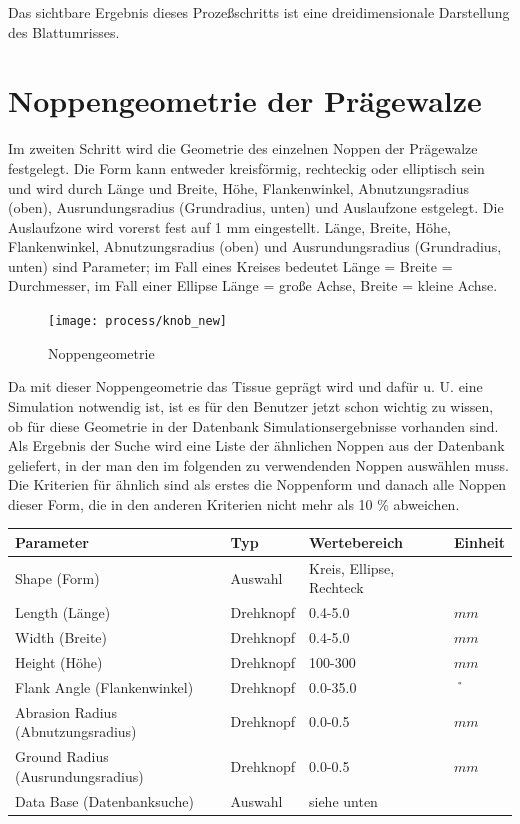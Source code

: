 Das sichtbare Ergebnis dieses Proze\ss schritts ist eine dreidimensionale
Darstellung des Blattumrisses.

\section{Noppengeometrie der Pr\"agewalze}
Im zweiten Schritt wird die Geometrie des einzelnen Noppen der Pr\"agewalze 
festgelegt. Die Form kann entweder kreisf\"ormig, rechteckig oder elliptisch sein
und wird durch L\"ange und Breite, H\"ohe, Flankenwinkel, Abnutzungsradius
(oben), Ausrundungsradius (Grundradius, unten) und Auslaufzone 
estgelegt. Die Auslaufzone wird vorerst fest auf 1 mm eingestellt.
L\"ange, Breite, H\"ohe, Flankenwinkel, Abnutzungsradius
(oben) und Ausrundungsradius (Grundradius, unten) sind Parameter; im Fall eines
Kreises bedeutet L\"ange = Breite = Durchmesser, im Fall einer Ellipse L\"ange
= gro\ss e Achse, Breite = kleine Achse.

\begin{figure}[!Hhtp]
  \begin{center}
   \texttt{[image: process/knob\_new]}
   \caption{Noppengeometrie}
  \end{center}
\end{figure}

Da mit dieser Noppengeometrie das Tissue gepr\"agt wird und daf\"ur u. U.
eine Simulation notwendig ist, ist es f\"ur den
Benutzer jetzt schon wichtig zu wissen, ob f\"ur diese Geometrie 
in der Datenbank Simulationsergebnisse vorhanden sind. Als Ergebnis
der Suche wird eine Liste der \"ahnlichen Noppen aus der Datenbank
geliefert, in der man den im folgenden zu verwendenden Noppen ausw\"ahlen muss.
Die Kriterien f\"ur \"ahnlich sind als erstes die Noppenform und danach alle
Noppen dieser Form, die in den anderen Kriterien nicht mehr als 10 \% abweichen.

\vspace{0.5cm}
\begin{tabular}{|l|l|l|l|} \hline
Parameter 			& Typ 		& Wertebereich 	& Einheit	\\ \hline
Shape (Form) 			& Auswahl 	& Kreis, Ellipse, Rechteck &	\\ \hline		
Length (L\"ange)  	        & Drehknopf & 0.4-5.0	& $mm$ 		\\ \hline
Width (Breite)	            	& Drehknopf & 0.4-5.0	& $mm$ 		\\ \hline
Height (H\"ohe)				& Drehknopf	& 100-300 		& $mm$ 	\\ \hline
Flank Angle (Flankenwinkel)		& Drehknopf	& 0.0-35.0 		& $\symbol{23}$ 		\\ \hline
Abrasion Radius (Abnutzungsradius)	& Drehknopf	& 0.0-0.5 		& $mm$ 		\\ \hline
Ground Radius (Ausrundungsradius)	& Drehknopf	& 0.0-0.5 		& $mm$ 		\\ \hline
Data Base (Datenbanksuche)		& Auswahl	& siehe unten   &			\\ \hline
\end{tabular}
\vspace{0.5cm}




